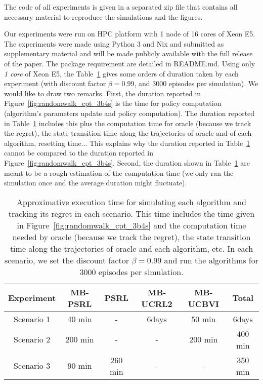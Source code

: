 \begin{subappendices}
The code of all experiments is given in a separated zip file that contains all necessary material to reproduce the simulations and the figures. 

Our experiments were run on HPC platform with 1 node of 16 cores of Xeon E5. The experiments were made using Python 3 and Nix and submitted as supplementary material and will be made publicly available with the full release of the paper. The package requirement are detailed in README.md. Using only \emph{1 core} of Xeon E5, the Table~\ref{tab:sim_time} gives some orders of duration taken by each experiment (with discount factor $\beta=0.99$, and 3000 episodes per simulation). We would like to draw two remarks. First, the duration reported in Figure~\ref{fig:randomwalk_cpt_3b4s} is the time for policy computation (algorithm's parameters update and policy computation). The duration reported in Table~\ref{tab:sim_time} includes this plus the computation time for oracle (because we track the regret), the state transition time along the trajectories of oracle and of each algorithm, resetting time... This explains why the duration reported in Table~\ref{tab:sim_time} cannot be compared to the duration reported in Figure~\ref{fig:randomwalk_cpt_3b4s}.  Second, the duration shown in Table~\ref{tab:sim_time} are meant to be a rough estimation of the computation time (we only ran the simulation once and the average duration might fluctuate). 

\begin{table}[ht]
    \centering
    \begin{tabular}{ |c|c|c|c|c|c| } 
    \hline
    Experiment & MB-PSRL  & PSRL & MB-UCRL2 & MB-UCBVI & Total\\
    \hline
    Scenario 1 & 40 min  & - & 6days & 50 min & 6days\\ 
    \hline
    Scenario 2 & 200 min  & - & - & 200 min & 400 min\\ 
    \hline
    Scenario 3 & 90 min  & 260 min & - & - & 350 min\\ 
    \hline
    \end{tabular}
\vspace{0.2cm}
\caption{Approximative execution time for simulating each algorithm and tracking its regret in each scenario. This time includes the time given in Figure~\ref{fig:randomwalk_cpt_3b4s} and the computation time needed by oracle (because we track the regret), the state transition time along the trajectories of oracle and each algorithm, etc. In each scenario, we set the discount factor $\beta=0.99$ and run the algorithms for $3000$ episodes per simulation.}
\label{tab:sim_time}
\end{table}

\end{subappendices}

\endgroup
